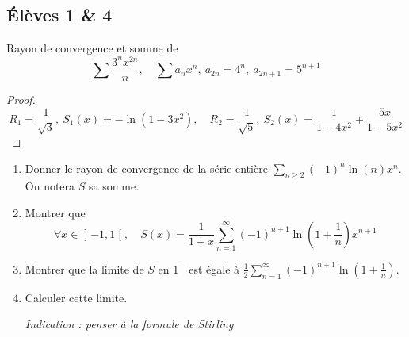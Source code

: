 \documentclass[10pt]{scrartcl}
\title{}
\author{}
\date{}
\begin{document}
    \subsection*{Élèves 1 \& 4}
    \begin{ccp}
        Rayon de convergence et somme de 
        \[
            \sum\frac{3^nx^{2n}}n,\quad\sum a_nx^n,\ a_{2n}=4^n,\ a_{2n+1}=5^{n+1}
        \]
    \end{ccp}

    \begin{proof}
        \[
            R_1=\frac1{\sqrt3},\ S_1(x)=-\ln(1-3x^2),\quad R_2=\frac1{\sqrt5},\ S_2(x)=\frac1{1-4x^2}+\frac{5x}{1-5x^2}
        \]
    \end{proof}

    \begin{exo}
        \begin{enumerate}
            \item Donner le rayon de convergence de la série entière $\sum_{n\geq 2}(-1)^n\ln(n)x^n$.
            On notera $S$ sa somme. 
            \item Montrer que 
            \[
                \forall x\in\mathopen]-1,1\mathclose[,\quad 
                S(x)=\frac1{1+x}\sum_{n=1}^\infty(-1)^{n+1}\ln\left(1+\frac1n\right)x^{n+1}
            \]
            \item Montrer que la limite de $S$ en $1^-$ est égale à $\frac12\sum_{n=1}^\infty(-1)^{n+1}\ln\left(1+\frac1n\right)$.
            \item Calculer cette limite. 
            
            \textit{Indication : penser à la formule de Stirling}
        \end{enumerate}
    \end{exo}
\end{document}
